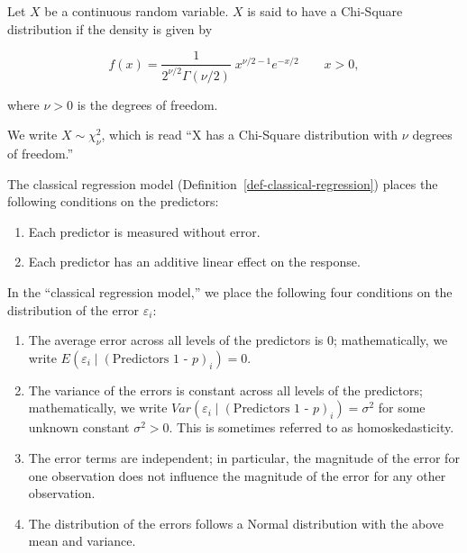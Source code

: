 \documentclass[
  letterpaper,
  DIV=11,
  numbers=noendperiod]{scrreprt}
\providecommand{\tightlist}{%
  \setlength{\itemsep}{0pt}\setlength{\parskip}{0pt}}\usepackage{longtable,booktabs,array}
\theoremstyle{definition}
\theoremstyle{definition}
\theoremstyle{remark}
\begin{document}
\begin{description}
\tightlist
\item[Chi-Square Distribution
(Definition~\ref{def-chi-square-distribution})]
Let \(X\) be a continuous random variable. \(X\) is said to have a
Chi-Square distribution if the density is given by
\end{description}

\[f(x) = \frac{1}{2^{\nu/2}\Gamma (\nu/2)}\;x^{\nu/2-1}e^{-x/2} \qquad x > 0,\]

where \(\nu > 0\) is the degrees of freedom.

We write \(X \sim \chi^2_{\nu}\), which is read ``X has a Chi-Square
distribution with \(\nu\) degrees of freedom.''

\begin{description}
\tightlist
\item[Classical Regression (Conditions on Predictors)
(Definition~\ref{def-classical-regression-cont})]
The classical regression model
(Definition~\ref{def-classical-regression}) places the following
conditions on the predictors:
\end{description}

\begin{enumerate}
\def\labelenumi{\arabic{enumi}.}
\tightlist
\item
  Each predictor is measured without error.
\item
  Each predictor has an additive linear effect on the response.
\end{enumerate}

\begin{description}
\tightlist
\item[Classical Regression Model
(Definition~\ref{def-classical-regression})]
In the ``classical regression model,'' we place the following four
conditions on the distribution of the error \(\varepsilon_i\):
\end{description}

\begin{enumerate}
\def\labelenumi{\arabic{enumi}.}
\tightlist
\item
  The average error across all levels of the predictors is 0;
  mathematically, we write
  \(E\left(\varepsilon_i \mid (\text{Predictors 1 - }p)_i\right) = 0\).
\item
  The variance of the errors is constant across all levels of the
  predictors; mathematically, we write
  \(Var\left(\varepsilon_i \mid (\text{Predictors 1 - }p)_i\right) = \sigma^2\)
  for some unknown constant \(\sigma^2 > 0\). This is sometimes referred
  to as homoskedasticity.
\item
  The error terms are independent; in particular, the magnitude of the
  error for one observation does not influence the magnitude of the
  error for any other observation.
\item
  The distribution of the errors follows a Normal distribution with the
  above mean and variance.
\end{enumerate}
\end{document}
